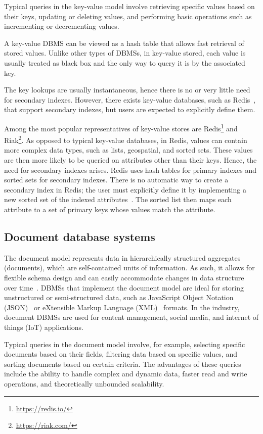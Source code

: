 Typical queries in the key-value model involve retrieving specific values based on their keys, updating or deleting values, and performing basic operations such as incrementing or decrementing values.

A key-value DBMS can be viewed as a hash table that allows fast retrieval of stored values. Unlike other types of DBMSs, in key-value stored, each value is usually treated as black box and the only way to query it is by the associated key.

The key lookups are usually instantaneous, hence there is no or very little need for secondary indexes. However, there exists key-value databases, such as Redis~\citep{RedisIndexes}, that support secondary indexes, but users are expected to explicitly define them.

Among the most popular representatives of key-value stores are Redis\footnote{\url{https://redis.io/}} and Riak\footnote{\url{https://riak.com/}}. As opposed to typical key-value databases, in Redis, values can contain more complex data types, such as lists, geospatial, and sorted sets. These values are then more likely to be queried on attributes other than their keys. Hence, the need for secondary indexes arises. Redis uses hash tables for primary indexes and sorted sets for secondary indexes. There is no automatic way to create a secondary index in Redis; the user must explicitly define it by implementing a new sorted set of the indexed attributes~\citep{RedisIndexes}.
The sorted list then maps each attribute to a set of primary keys whose values match the attribute. 

\subsection{Document database systems}
The document model represents data in hierarchically structured aggregates (documents), which are self-contained units of information. As such, it allows for flexible schema design and can easily accommodate changes in data structure over time~\citep{DBLP:conf/er/ContosS20}. DBMSs that implement the document model are ideal for storing unstructured or semi-structured data, such as JavaScript Object Notation (JSON)~\citep{JSON} or eXtensible Markup Language (XML)~\citep{XML} formats. In the industry, document DBMSs are used for content management, social media, and internet of things (IoT) applications.

Typical queries in the document model involve, for example, selecting specific documents based on their fields, filtering data based on specific values, and sorting documents based on certain criteria. The advantages of these queries include the ability to handle complex and dynamic data, faster read and write operations, and theoretically unbounded scalability.

